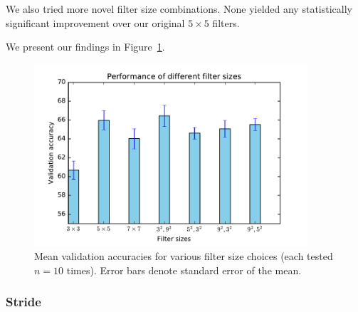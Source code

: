 \documentclass{article}
\begin{document}
\begin{multicols}{2}
We also tried more novel filter size combinations.
None yielded any statistically significant improvement
over our original $5\times 5$ filters.

We present our findings
in Figure~\ref{fig:filter-size-experiment}.

\begin{figure}[t]
   \centering
   \includegraphics[width=4in]{img/2-5-filter-size-acc.pdf} 
   \caption{Mean validation accuracies for various filter size choices (each tested $n=10$ times).
       Error bars denote standard error of the mean.}
   \label{fig:filter-size-experiment}
\end{figure}



\subsubsection{Stride}


\end{multicols}
\end{document}
